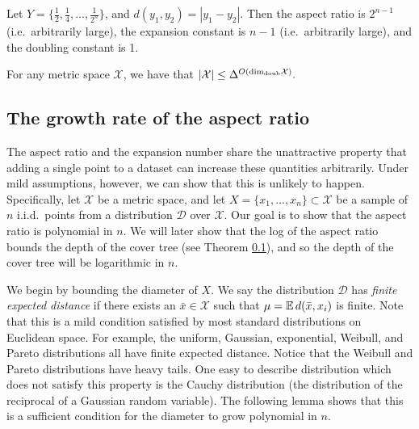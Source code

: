 \documentclass[../main.tex]{subfiles}
\newcommand{\set}[1]{\mathcal {#1}}
\newcommand{\distribution}[1]{\mathcal {#1}}
\newcommand{\dist}[2]{\distf({#1},{#2})}
\newcommand{\distf}{d}
\newcommand{\aspect}[1]{\Delta}
\newcommand{\doubdim}{\text{dim}_\textnormal{doub}}
\begin{document}
\begin{example}
    Let $Y=\{\frac 1 2, \frac 1 4, ..., \frac 1 {2^n}\}$,
    and $\dist{y_1}{y_2}=|y_1-y_2|$.
    Then the aspect ratio is $2^{n-1}$ (i.e.\ arbitrarily large),
    the expansion constant is $n-1$ (i.e.\ arbitrarily large),
    and the doubling constant is 1.
\end{example}

\begin{lemma}
    For any metric space $\set X$, we have that
    $
        |\set X| \le \aspect{\set X}^{O(\doubdim{\set X})}.
    $
\end{lemma}


\subsection{The growth rate of the aspect ratio}

The aspect ratio and the expansion number share the unattractive property that adding a single point to a dataset can increase these quantities arbitrarily.
Under mild assumptions, however, we can show that this is unlikely to happen.
Specifically, let $\set X$ be a metric space, 
and let $X=\{x_1,...,x_n\}\subset\set X$ be a sample of $n$ i.i.d.\ points from a distribution $\distribution D$ over $\set X$.
Our goal is to show that the aspect ratio is polynomial in $n$.
We will later show that the log of the aspect ratio bounds the depth of the cover tree (see Theorem \ref{}),
and so the depth of the cover tree will be logarithmic in $n$.

We begin by bounding the diameter of $X$.
We say the distribution $\distribution D$ has \emph{finite expected distance} if there exists an $\bar x\in\set X$ such that $\mu=\E\dist{\bar x}{x_i}$ is finite.
Note that this is a mild condition satisfied by most standard distributions on Euclidean space.
For example, the uniform, Gaussian, exponential, Weibull, and Pareto distributions all have finite expected distance.
Notice that the Weibull and Pareto distributions have heavy tails.
One easy to describe distribution which does not satisfy this property is the Cauchy distribution 
(the distribution of the reciprocal of a Gaussian random variable).
The following lemma shows that this is a sufficient condition for the diameter to grow polynomial in $n$.
\end{document}

